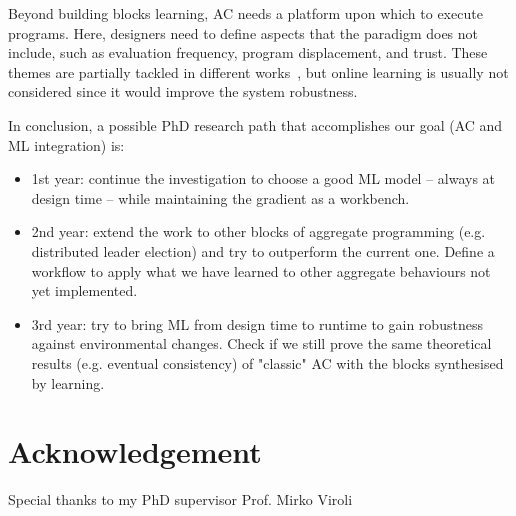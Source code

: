 \documentclass[conference]{IEEEtran}
\begin{document}
%
%

Beyond building blocks learning, AC needs a platform upon which to execute programs. 
%
Here, designers need to define aspects that the paradigm does not include, such as evaluation frequency, program displacement, and trust.
% 
These themes are partially tackled in different works~\cite{DBLP:journals/scp/CasadeiAV18, DBLP:journals/fi/CasadeiPPVW20, DBLP:journals/corr/abs-2012-13806}, but online learning is usually not considered since it would improve the system robustness.

%
%
In conclusion, a possible PhD research path that accomplishes our goal (AC and ML integration) is:
\begin{itemize}
    \item 1st year: continue the investigation to choose a good ML model -- always at design time -- while maintaining the gradient as a workbench.
    \item 2nd year: extend the work to other blocks of aggregate programming (e.g. distributed leader election) and try to outperform the current one. Define a workflow to apply what we have learned to other aggregate behaviours not yet implemented.
    \item 3rd year: try to bring ML from design time to runtime to gain robustness against environmental changes. Check if we still prove the same theoretical results (e.g. eventual consistency) of "classic" AC with the blocks synthesised by learning.
\end{itemize}
\section*{Acknowledgement}
Special thanks to my PhD supervisor Prof. Mirko Viroli


\end{document}
